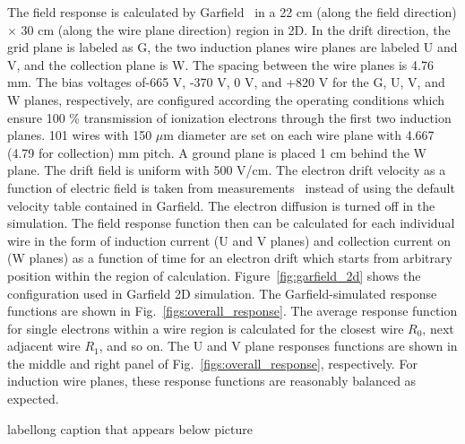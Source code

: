 The field response is calculated by Garfield~\cite{garfield} in a 22 cm (along the 
field direction) $\times$ 30 cm (along the wire plane direction) region in 2D.  
In the drift direction, the grid plane is labeled as G, the two induction planes wire 
planes are labeled U and V, and the collection plane is W.  The spacing between the wire 
planes is 4.76 mm. The bias voltages of-665 V, -370 V, 0 V, and +820 V for the G, U, V, and 
W planes, respectively, are configured according the operating conditions which ensure 100 \%
    transmission of ionization electrons through the first two induction planes.  
    101 wires with 150 $\mu$m diameter are set on each wire plane with 4.667 (4.79 for collection) mm
    pitch.  A ground plane is placed 1 cm behind the W plane.  The drift
    field is uniform with 500 V/cm. The electron drift velocity as a function of
    electric field is taken from measurements~\cite{Li:2015rqa,lar_property}
    instead of using the default velocity table contained in Garfield. The electron
    diffusion is turned off in the simulation. The field response function then can
    be calculated for each individual wire in the form of induction current 
    (U and V planes) and collection current on (W planes) as a function of time for
    an electron drift which starts from arbitrary position within the region of calculation.
    Figure~\ref{fig:garfield_2d} shows the configuration used in Garfield 2D simulation.
The Garfield-simulated response functions are shown in Fig.~\ref{figs:overall_response}.
 The average response function for single electrons within a wire region 
is calculated for the closest wire $R_0$, next adjacent wire $R_1$, and so on. The U and 
V plane responses functions are shown in the middle and right panel of 
Fig.~\ref{figs:overall_response}, respectively.  For induction wire planes, these response 
functions are reasonably balanced as expected.


\begin{cdrfigure}{label}{long caption that appears below picture}
\end{cdrfigure}


